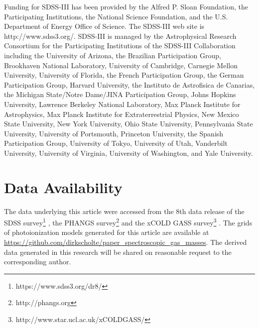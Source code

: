 \documentclass[fleqn,usenatbib]{mnras}
\begin{document}
Funding for SDSS-III has been provided by the Alfred P. Sloan Foundation, the Participating Institutions, the National Science Foundation, and the U.S. Department of Energy Office of Science. The SDSS-III web site is http://www.sdss3.org/. SDSS-III is managed by the Astrophysical Research Consortium for the Participating Institutions of the SDSS-III Collaboration including the University of Arizona, the Brazilian Participation Group, Brookhaven National Laboratory, University of Cambridge, Carnegie Mellon University, University of Florida, the French Participation Group, the German Participation Group, Harvard University, the Instituto de Astrofisica de Canarias, the Michigan State/Notre Dame/JINA Participation Group, Johns Hopkins University, Lawrence Berkeley National Laboratory, Max Planck Institute for Astrophysics, Max Planck Institute for Extraterrestrial Physics, New Mexico State University, New York University, Ohio State University, Pennsylvania State University, University of Portsmouth, Princeton University, the Spanish Participation Group, University of Tokyo, University of Utah, Vanderbilt University, University of Virginia, University of Washington, and Yale University.  

\section*{Data Availability}

The data underlying this article were accessed from the 8th data release of the SDSS survey\footnote{https://www.sdss3.org/dr8/} \citep{abazajian2009}, the PHANGS survey\footnote{http://phangs.org} \citep{emsellem2021,leroy2021} and the xCOLD GASS survey\footnote{http://www.star.ucl.ac.uk/xCOLDGASS/} \citep{saintonge2017}. The grids of photoionization models generated for this article are available at \href{https://github.com/dirkscholte/paper_spectroscopic_gas_masses}{https://github.com/dirkscholte/paper\_spectroscopic\_gas\_masses}. The derived data generated in this research will be shared on reasonable request to the corresponding author.








\end{document}
